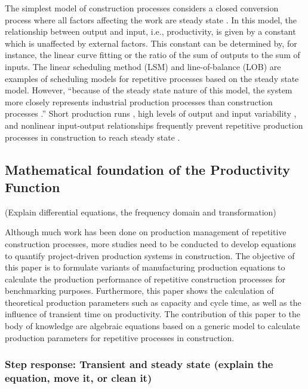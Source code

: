 \documentclass{article}
\begin{document}
The simplest model of construction processes considers a closed conversion process where all factors affecting the work are steady state \cite{Drewin1982}.
In this model, the relationship between output and input, i.e., productivity, is given by a constant which is unaffected by external factors.
This constant can be determined by, for instance, the linear curve fitting or the ratio of the sum of outputs to the sum of inputs.
The linear scheduling method (LSM) \cite{Harmelink1998,Su2016} and line-of-balance (LOB) \cite{Lumsden1968,Su2016,ZolfagharDolabi2014} are examples of scheduling models for repetitive processes based on the steady state model.
However, ``because of the steady state nature of this model, the system more closely represents industrial production processes than construction processes \cite{Thomas1990}.''
Short production runs \cite{Bashford2005}, high levels of output and input variability \cite{Gonzalez2009}, and nonlinear input-output relationships \cite{Bertelsen2003,Lutz1993} frequently prevent repetitive production processes in construction to reach steady state \cite{Antunes2015a,Walsh2007}.

\subsection{Mathematical foundation of the Productivity Function}
\label{sec:org7a5d72b}

(Explain differential equations, the frequency domain and transformation)

Although much work has been done on production management of repetitive construction processes, more studies need to be conducted to develop equations to quantify project-driven production systems in construction.
The objective of this paper is to formulate variants of manufacturing production equations to calculate the production performance of repetitive construction processes for benchmarking purposes.
Furthermore, this paper shows the calculation of theoretical production parameters such as capacity and cycle time, as well as the influence of transient time on productivity.
The contribution of this paper to the body of knowledge are algebraic equations based on a generic model to calculate production parameters for repetitive processes in construction.

\subsubsection{Step response: Transient and steady state (explain the equation, move it, or clean it)}
\label{sec:orgda84b97}
\end{document}
